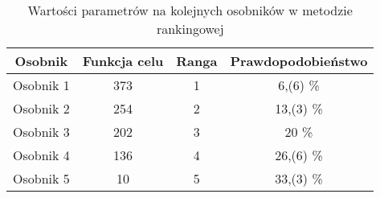 \begin{table}[h!]
\begin{center}
\begin{tabular}{|c|c|c|c|}
\hline
\textbf{Osobnik}  & \textbf{Funkcja celu} & \textbf{Ranga} & \textbf{Prawdopodobieństwo}\\
\hline
Osobnik 1 & 373 & 1 & 6,(6) \% \\
\hline
Osobnik 2 &254 & 2  & 13,(3)  \% \\
\hline
Osobnik 3 & 202 & 3 & 20  \% \\
\hline
Osobnik 4 & 136 & 4 & 26,(6)  \% \\
\hline
Osobnik 5 & 10 & 5 & 33,(3)  \% \\
\hline
\end{tabular}
\caption{Wartości parametrów na kolejnych osobników w metodzie rankingowej}
\end{center}
\end{table}

\vspace{0,4cm}

